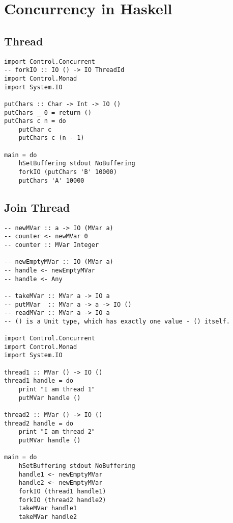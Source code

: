 \documentclass[twocolumn,landscape,10pt]{article}
\theoremstyle{definition}
\begin{document}

\newpage
\section{Concurrency in Haskell}

\subsection{Thread}

\begin{lstlisting}[Haskell]
import Control.Concurrent
-- forkIO :: IO () -> IO ThreadId
import Control.Monad
import System.IO

putChars :: Char -> Int -> IO ()
putChars _ 0 = return ()
putChars c n = do
    putChar c
    putChars c (n - 1)

main = do
    hSetBuffering stdout NoBuffering
    forkIO (putChars 'B' 10000)
    putChars 'A' 10000
\end{lstlisting} 

\subsection{Join Thread}

\begin{lstlisting}[Haskell]
-- newMVar :: a -> IO (MVar a)
-- counter <- newMVar 0
-- counter :: MVar Integer

-- newEmptyMVar :: IO (MVar a)
-- handle <- newEmptyMVar
-- handle <- Any

-- takeMVar :: MVar a -> IO a
-- putMVar  :: MVar a -> a -> IO ()
-- readMVar :: MVar a -> IO a
-- () is a Unit type, which has exactly one value - () itself.

import Control.Concurrent
import Control.Monad
import System.IO

thread1 :: MVar () -> IO ()
thread1 handle = do
    print "I am thread 1"
    putMVar handle ()

thread2 :: MVar () -> IO ()
thread2 handle = do
    print "I am thread 2"
    putMVar handle ()

main = do
    hSetBuffering stdout NoBuffering
    handle1 <- newEmptyMVar
    handle2 <- newEmptyMVar
    forkIO (thread1 handle1)
    forkIO (thread2 handle2)
    takeMVar handle1
    takeMVar handle2
\end{lstlisting} 
\end{document}

